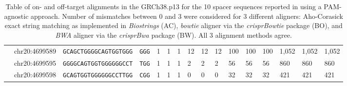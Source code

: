 \documentclass[pdftex,english,10pt]{article}
\begin{document}
{\begin{table}[h]
{\begin{tabular}{|l|lll|llllllllllll|}
                                           & chr20:4699589                                         & \texttt{GCAGCTGGGGCAGTGGTGGG}                        & \texttt{GGG}                                       & 1                     &           1                 & \multicolumn{1}{l|}{1}    & 12                    & 12                          & \multicolumn{1}{l|}{12}    & 100                    &       100                     & \multicolumn{1}{l|}{100}    & 1,052                 &  1,052                          &      1,052                    \\
                                           & chr20:4699595                                         & \texttt{GGGGCAGTGGTGGGGGGCCT}                        & \texttt{TGG}                                       & 1                     &         1                  & \multicolumn{1}{l|}{1}   & 2                     &      2                      & \multicolumn{1}{l|}{2}    & 56                    & 56                         & \multicolumn{1}{l|}{56}    & 860                   & 860                           &      860                     \\
                                           & chr20:4699598                                         & \texttt{GCAGTGGTGGGGGGCCTTGG}                        & \texttt{CGG}                                       & 1                     &          1                  & \multicolumn{1}{l|}{1}    & 0                     &      0                      & \multicolumn{1}{l|}{0}    & 32                    &   32                         & \multicolumn{1}{l|}{32}    & 421                   &           421                   &        421                  \\ \hline
\end{tabular}
}
\caption{Table of on- and off-target alignments in the GRCh38.p13 for the 10 spacer sequences reported in \citet{multicrispr} using a PAM-agnostic approach. Number of mismatches between 0 and 3 were considered for 3 different aligners: Aho-Corasick exact string matching as implemented in \textit{Biostrings} (AC), \textit{bowtie} aligner via the \textit{crisprBowtie} package (BO), and \textit{BWA} aligner via the \textit{crisprBwa} package (BW). All 3 alignment methods agree. }
\label{supptab:offtargets}
\end{table}



}
\end{document}
